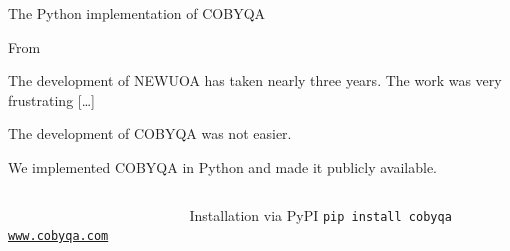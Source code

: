 \documentclass[optimization]{common/talk}
\begin{document}
\begin{frame}[fragile]{The Python implementation of COBYQA}
    \begin{block}{From \cite{Powell_2006}}
        \begin{quoting}
            \small%
            The development of NEWUOA has taken nearly \alert{three years}.
            The work was very \alert{frustrating} [\dots]
        \end{quoting}
        The development of COBYQA was \alert{not easier}.
    \end{block}

    \medskip

    We implemented COBYQA in \alert{Python} and made it publicly available.

    \medskip

    \begin{columns}
        \begin{column}{0.4\textwidth}
            \begin{center}
                \\[1ex]
                \href{https://www.cobyqa.com}{\texttt{www.cobyqa.com}}
            \end{center}
        \end{column}
        \begin{column}{0.6\textwidth}
            \begin{block}{Installation via PyPI}
                \texttt{pip install cobyqa}
            \end{block}
        \end{column}
    \end{columns}
\end{frame}
\end{document}
